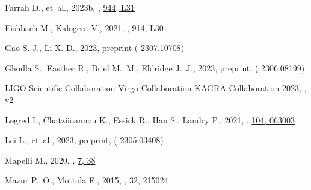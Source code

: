 \documentclass[fleqn,usenatbib,useAMS]{mnras}
\begin{document}
\begin{thebibliography}{}
Farrah D.,  et~al., 2023b, , \href {https://ui.adsabs.harvard.edu/abs/2023ApJ...944L..31F} {944, L31}

Fishbach M.,  Kalogera V.,  2021, , \href {https://ui.adsabs.harvard.edu/abs/2021ApJ...914L..30F} {914, L30}

Gao S.-J.,  Li X.-D.,  2023, preprint ( {2307.10708})

Ghodla S.,  Easther R.,  Briel M.~M.,   Eldridge J.~J.,  2023, preprint, \href {https://ui.adsabs.harvard.edu/abs/2023arXiv230608199G} {} ( {2306.08199})

{LIGO Scientific Collaboration} {Virgo Collaboration}  {KAGRA Collaboration} 2023, , v2

Legred I.,  Chatziioannou K.,  Essick R.,  Han S.,   Landry P.,  2021, , \href {https://ui.adsabs.harvard.edu/abs/2021PhRvD.104f3003L} {104, 063003}

Lei L.,  et~al., 2023, preprint, \href {https://ui.adsabs.harvard.edu/abs/2023arXiv230503408L} {} ( {2305.03408})

Mapelli M.,  2020, , \href {https://ui.adsabs.harvard.edu/abs/2020FrASS...7...38M} {7, 38}

Mazur P.~O.,  Mottola E.,  2015, , 32, 215024


\end{thebibliography}
\end{document}
